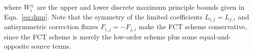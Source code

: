 where $W_i^\pm$ are the upper and lower discrete maximum principle bounds
given in Eqn.~\ref{eq:dmp}.
Note that the symmetry of the limited coefficients $L_{i,j}=L_{j,i}$ and
antisymmetric correction fluxes $F_{i,j}=-F_{j,i}$ make the FCT scheme conservative, since
the FCT scheme is merely the low-order scheme plus some equal-and-opposite source
terms.
